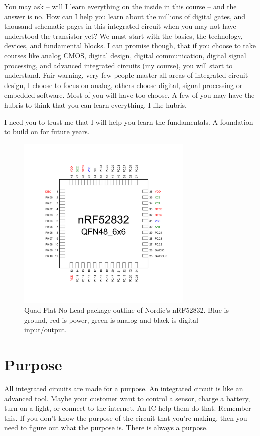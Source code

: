 \documentclass[technote,10pt,a4paper]{IEEEtran}
\begin{document}
You may ask -- will I learn everything on the inside in this course -- and the
answer is no. How can I help you learn about the millions of digital
gates, and thousand schematic pages in this integrated circuit when you may not
have understood the transistor yet? We must start with the basics, the
technology, devices, and fundamental blocks.  I can promise though, that if you choose to take courses like
analog CMOS, digital design, digital communication, digital signal processing,
and advanced integrated circuits (my course), you will start to understand. Fair
warning, very few people master all areas of integrated circuit design, I choose to
focus on analog, others choose digital, signal processing or embedded software. Most of you will have too choose. A few of you may have the hubris
to think that you can learn everything. I like hubris.

I need you to trust me that I will help you learn the fundamentals. A
foundation to build on for future years.


\begin{figure}[tb]
  \centerline{\includegraphics[width=3.3in]{qfn48}}
  \caption{Quad Flat No-Lead package outline of Nordic's nRF52832. Blue is
    ground, red is power, green is analog and black is digital input/output.}
\label{fig_qfn}
\end{figure}


\section{Purpose}
All integrated circuits are made for a purpose. An integrated circuit is like an advanced tool.
Maybe your customer want to control a sensor, charge a battery, turn on a light, or connect to the internet. An
IC help them do that. Remember this. If you don't know the purpose of the circuit that you're making,
then you need to figure out what the purpose is. There is always a purpose.
\end{document}
